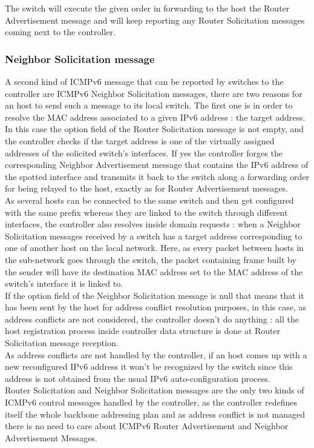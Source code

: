 \documentclass{article}
\begin{document}
The switch will execute the given order in forwarding to the host the
Router Advertisement message and will keep reporting any Router
Solicitation messages coming next to the controller.\\

\subsubsection{Neighbor Solicitation message}

A second kind of ICMPv6 message that can be reported by switches to
the controller are ICMPv6 Neighbor Solicitation messages, there are
two reasons for an host to send such a message to its local switch. The
first one is in order to resolve the MAC address associated to a given
IPv6 address : the target address. In this case the option field of
the Router Solicitation message is not empty, and the controller
checks if the target address is one of the virtually assigned
addresses of the solicited switch's interfaces. If yes the controller
forges the corresponding Neighbor Advertisement message that contains
the IPv6 address of the spotted interface and transmits it back to the
switch along a forwarding order for being relayed to the host, exactly
as for Router Advertisement messages.\\
\newline
As several hosts can be connected to the same switch and then get
configured with the same prefix whereas they are linked to the switch
through different interfaces, the controller also resolves inside
domain requests : when a Neighbor Solicitation messages received by a
switch has a target address corresponding to one of another host on
the local network. Here, as every packet between hosts in the
sub-network goes through the switch, the packet containing frame built
by the sender will have its destination MAC address set to the MAC
address of the switch's interface it is linked to.\\
\newline
If the option field of the Neighbor Solicitation message is null that
means that it has been sent by the host for address conflict
resolution purposes, in this case, as address conflicts are not
considered, the controller doesn't do anything : all the host
registration process inside controller data structure is done at
Router Solicitation message reception.\\
\newline
As address conflicts are not handled by the controller, if an host
comes up with a new reconfigured IPv6 address it won't be recognized
by the switch since this address is not obtained from the usual IPv6
auto-configuration process.\\
\newline
Router Solicitation and Neighbor Solicitation messages are the only
two kinds of ICMPv6 control messages handled by the controller, as the
controller redefines itself the whole backbone addressing plan and as
address conflict is not managed there is no need to care about ICMPv6
Router Advertisement and Neighbor Advertisement Messages.
\end{document}
